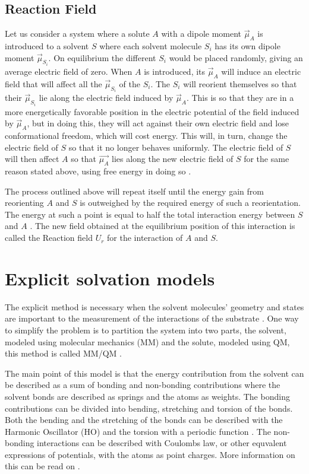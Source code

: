 \documentclass[../master_thesis.tex]{subfiles}
\begin{document}
\subsection{Reaction Field}\label{Reaction_field}
Let us consider a system where a solute $A$ with a dipole moment $\vec{\mu}_A$ is
introduced to a solvent $S$ where each solvent molecule $S_i$ has its own dipole
moment $\vec{\mu}_{S_i}$. On equilibrium the different $S_i$  would be placed
randomly, giving an average electric field of zero. When $A$ is introduced, its
$\vec{\mu}_A$ will induce an electric field that will affect all the
$\vec{\mu}_{S_i}$ of the $S_i$. The $S_i$ will reorient themselves so that their
$\vec{\mu}_{S_i}$ lie along the electric field induced by $\vec{\mu}_A$. This is
so that they are in a more energetically favorable position in the electric
potential of the field induced by $\vec{\mu}_A$, but in doing this, they will
act against their own electric field and lose conformational freedom, which will
cost energy. This will, in turn, change the electric field of $S$ so that it no
longer behaves uniformly. The electric field of $S$ will then affect $A$ so that
$\vec{\mu_A}$ lies along the new electric field of $S$ for the same reason
stated above, using free energy in doing so \cite{Cramer:2004}.

The process outlined above will repeat itself until the energy gain from
reorienting $A$ and $S$ is outweighed by the required energy of such a
reorientation. The energy at such a point is equal to half the total interaction
energy between $S$ and $A$ \cite{Cramer:2004}. The new field obtained at the
equilibrium position of this interaction is called the Reaction field $U_r$ for
the interaction of $A$ and $S$.

\section{Explicit solvation models}

The explicit method is necessary when the solvent molecules' geometry and states
are important to the measurement of the interactions of the substrate
\cite{Cramer:2004}.
One way to simplify the problem is to partition the system into two parts, the
solvent, modeled using molecular mechanics (MM) and the solute, modeled using
\ac{QM}, this method is called MM/QM \cite{Mennucci:2018}.

The main point of this model is that the energy contribution from the solvent
can be described as a sum of bonding and non-bonding contributions
\cite{Cramer:2004} where the solvent bonds are described as springs
\cite{Mennucci:2018} and the atoms as weights. The bonding contributions can be
divided into bending, stretching and torsion of the bonds. Both the bending
and the stretching of the bonds can be described with the Harmonic Oscillator
(HO) and the torsion with a periodic function \cite{Mennucci:2018}. The
non-bonding interactions can be described with Coulombs law, or other equvalent
expressions of potentials, with the atoms as point charges. More information on
this can be read on \cite{Cramer:2004, Jensen:2017}.
\end{document}
